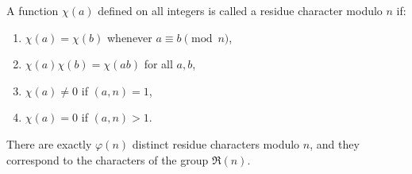 A function $\chi(a)$ defined on all integers is called a residue character modulo $n$ if:
\begin{enumerate}
\item[(1)] $\chi(a) = \chi(b)$ whenever $a \equiv b \pmod{n}$,
\item[(2)] $\chi(a)\chi(b) = \chi(ab)$ for all $a, b$,
\item[(3)] $\chi(a) \neq 0$ if $(a, n) = 1$,
\item[(4)] $\chi(a) = 0$ if $(a, n) > 1$.
\end{enumerate}
There are exactly $\varphi(n)$ distinct residue characters modulo $n$, and they correspond to the characters of the group $\mathfrak{R}(n)$.
